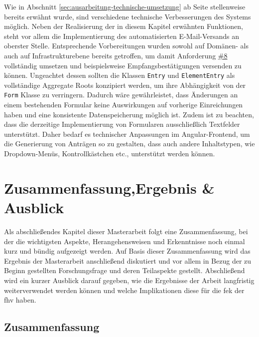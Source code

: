 \documentclass[a4paper,12pt,twoside]{scrreprt}
\begin{document}
Wie in Abschnitt \ref{sec:ausarbeitung-technische-umsetzung} ab Seite \pageref{sec:ausarbeitung-technische-umsetzung} stellenweise bereits erwähnt wurde, sind verschiedene technische Verbesserungen des Systems möglich. Neben der Realisierung der in diesem Kapitel erwähnten Funktionen, steht vor allem die Implementierung des automatisierten E-Mail-Versands an oberster Stelle. Entsprechende Vorbereitungen wurden sowohl auf Domänen- als auch auf Infrastrukturebene bereits getroffen, um damit Anforderung \hyperref[sub-sub-sec:abgeleitete-anforderungen-nach-einreichung]{\#8} vollständig umsetzen und beispielsweise Empfangsbestätigungen versenden zu können. Ungeachtet dessen sollten die Klassen \texttt{Entry} und \texttt{ElementEntry} als vollständige Aggregate Roots konzipiert werden, um ihre Abhängigkeit von der \texttt{Form} Klasse zu verringern. Dadurch wäre gewährleistet, dass Änderungen an einem bestehenden Formular keine Auswirkungen auf vorherige Einreichungen haben und eine konsistente Datenspeicherung möglich ist. Zudem ist zu beachten, dass die derzeitige Implementierung von Formularen ausschließlich Textfelder unterstützt. Daher bedarf es technischer Anpassungen im Angular-Frontend, um die Generierung von Anträgen so zu gestalten, dass auch andere Inhaltstypen, wie Dropdown-Menüs, Kontrollkästchen etc., unterstützt werden können.

\cleardoublepage
\chapter[Zusammenfassung, Ergebnis \& Ausblick]{Zusammenfassung,\newline Ergebnis \& Ausblick}
\label{chap:zusammenfassung-ergebnis-ausblick}

Als abschließendes Kapitel dieser Masterarbeit folgt eine Zusammenfassung, bei der die wichtigsten Aspekte, Herangehensweisen und Erkenntnisse noch einmal kurz und bündig aufgezeigt werden. Auf Basis dieser Zusammenfassung wird das Ergebnis der Masterarbeit anschließend diskutiert und vor allem in Bezug der zu Beginn gestellten Forschungsfrage und deren Teilaspekte gestellt. Abschließend wird ein kurzer Ausblick darauf gegeben, wie die Ergebnisse der Arbeit langfristig weiterverwendet werden können und welche Implikationen diese für die \acl{fek} der \acl{fhv} haben.

\section{Zusammenfassung}
\label{sec:zuammenfassung}
\end{document}

